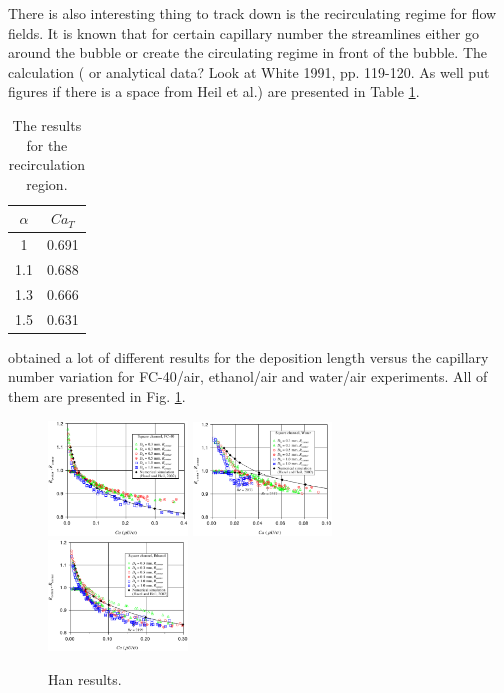 \documentclass{article}
\begin{document}
There is also interesting thing to track down is the recirculating regime for flow fields. It is
known that for certain capillary number the streamlines either go around the bubble or create the
circulating regime in front of the bubble. The calculation ({\color{red} or analytical data? Look
at White 1991, pp. 119-120. As well put figures if there is a space from Heil et al.}) are presented
in Table \ref{table:recirculation:data}.
\begin{table}
\begin{tabular}{c|c}
$\alpha$& $Ca_{T}$\\
\hline
1& 0.691\\
1.1 & 0.688\\
1.3 & 0.666\\
1.5 & 0.631\\
\end{tabular}
\caption{The results for the recirculation region.\label{table:recirculation:data}}
\end{table}

\citet{shikazono-square} obtained a lot of different results for the deposition length versus the
capillary number variation for FC-40/air, ethanol/air and water/air experiments. All of them are
presented in Fig. \ref{fig:deposition:han}.
\begin{figure}
\includegraphics[width=0.33\textwidth]{Figures/han_capillary_fc40_air.eps}\hfill
\includegraphics[width=0.33\textwidth]{Figures/han_capillary_water_air.eps}\hfill
\includegraphics[width=0.33\textwidth]{Figures/han_capillary_ethanol_air.eps}\\
\caption{Han results. \label{fig:deposition:han}}
\end{figure}
\end{document}
